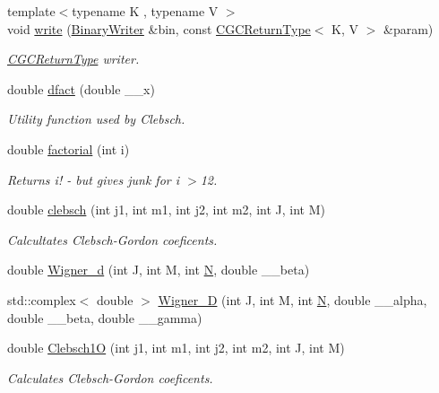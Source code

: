 \begin{DoxyCompactItemize}
{\footnotesize template$<$typename K , typename V $>$ }\\void \mbox{\hyperlink{namespaceHadron_a67e12d192d662851e588e9f3504ec45e}{write}} (\mbox{\hyperlink{classADATIO_1_1BinaryWriter}{Binary\+Writer}} \&bin, const \mbox{\hyperlink{structHadron_1_1CGCReturnType}{C\+G\+C\+Return\+Type}}$<$ K, V $>$ \&param)
\begin{DoxyCompactList}\small\item\em \mbox{\hyperlink{structHadron_1_1CGCReturnType}{C\+G\+C\+Return\+Type}} writer. \end{DoxyCompactList}\item 
double \mbox{\hyperlink{namespaceHadron_a5851b4dcb78567e53c44241a6db6c87e}{dfact}} (double \+\_\+\+\_\+x)
\begin{DoxyCompactList}\small\item\em Utility function used by Clebsch. \end{DoxyCompactList}\item 
double \mbox{\hyperlink{namespaceHadron_a0df3fb454ec05867e44777d4f5a6b7f7}{factorial}} (int i)
\begin{DoxyCompactList}\small\item\em Returns i! -\/ but gives junk for i $>$12. \end{DoxyCompactList}\item 
double \mbox{\hyperlink{namespaceHadron_ac4cba1d4aa3863fdc7991c208b3b9594}{clebsch}} (int j1, int m1, int j2, int m2, int J, int M)
\begin{DoxyCompactList}\small\item\em Calcultates Clebsch-\/\+Gordon coeficents. \end{DoxyCompactList}\item 
double \mbox{\hyperlink{namespaceHadron_a63c49af65c1d943a78205d3b8b63079a}{Wigner\+\_\+d}} (int J, int M, int \mbox{\hyperlink{operator__name__util_8cc_a7722c8ecbb62d99aee7ce68b1752f337}{N}}, double \+\_\+\+\_\+beta)
\item 
std\+::complex$<$ double $>$ \mbox{\hyperlink{namespaceHadron_a4d99a17c00bdddfc88a14c0571b74338}{Wigner\+\_\+D}} (int J, int M, int \mbox{\hyperlink{operator__name__util_8cc_a7722c8ecbb62d99aee7ce68b1752f337}{N}}, double \+\_\+\+\_\+alpha, double \+\_\+\+\_\+beta, double \+\_\+\+\_\+gamma)
\item 
double \mbox{\hyperlink{namespaceHadron_a78e0e843ad34636504d3ab3f2280e5e5}{Clebsch1O}} (int j1, int m1, int j2, int m2, int J, int M)
\begin{DoxyCompactList}\small\item\em Calculates Clebsch-\/\+Gordon coeficents. \end{DoxyCompactList}\item 

\end{DoxyCompactItemize}
